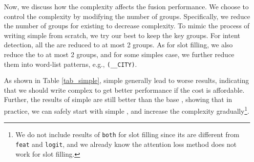 Now, we discuss how the \RE complexity affects the fusion performance.
We choose to control the \RE complexity by modifying the number of groups.
%
Specifically, we reduce the number of groups for existing \REs to decrease \RE complexity.
To mimic the process of writing simple \REs from scratch, we try our best to keep the key \RE groups.
For intent detection, all the \REs are reduced to at most 2 groups. %
As for slot filling, we also reduce the \REs to at most 2 groups, and for some simples case, we further reduce them into  word-list patterns, e.g., \texttt{(\_\_CITY)}. 

As shown in Table \ref{tab_simple}, simple \REs generally lead to worse results, indicating that we should write complex \REs to get better performance if the cost is affordable.
Further, the results of simple \REs are still better than the base \BLSTM, showing that in practice, we can safely start with simple \REs, and increase the complexity gradually\footnote{
We do not include results of \texttt{both} for slot filling since its \REs are different from \texttt{feat} and \texttt{logit}, and we already know the attention loss method does not work for slot filling.}.

